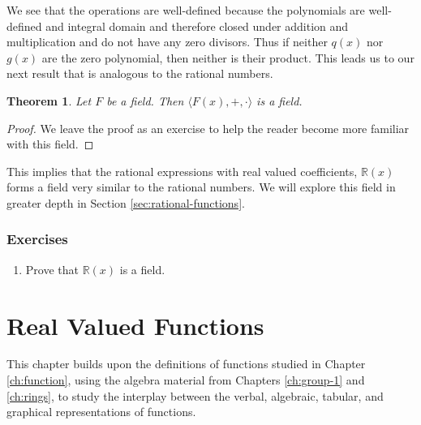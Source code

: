 \documentclass[
]{book}
\providecommand{\tightlist}{%
  \setlength{\itemsep}{0pt}\setlength{\parskip}{0pt}}
\newtheorem{theorem}{Theorem}[chapter]
\theoremstyle{definition}
\theoremstyle{definition}
\theoremstyle{definition}
\theoremstyle{remark}
\begin{document}
We see that the operations are well-defined because the polynomials are well-defined and integral domain and therefore closed under addition and multiplication and do not have any zero divisors. Thus if neither \(q(x)\) nor \(g(x)\) are the zero polynomial, then neither is their product. This leads us to our next result that is analogous to the rational numbers.

\begin{theorem}
\protect\hypertarget{thm:unnamed-chunk-207}{}{\label{thm:unnamed-chunk-207} }Let \(F\) be a field. Then \(\langle F(x),+,\cdot \rangle\) is a field.
\end{theorem}

\begin{proof}
{}We leave the proof as an exercise to help the reader become more familiar with this field.
\end{proof}

This implies that the rational expressions with real valued coefficients, \(\mathbb{R}(x)\) forms a field very similar to the rational numbers. We will explore this field in greater depth in Section \ref{sec:rational-functions}.

\hypertarget{exercises-26}{%
\subsection{Exercises}\label{exercises-26}}

\begin{enumerate}
\def\labelenumi{\arabic{enumi}.}
\tightlist
\item
  Prove that \(\mathbb{R}(x)\) is a field.
\end{enumerate}

\hypertarget{ch:real-valued-functions}{%
\chapter{Real Valued Functions}\label{ch:real-valued-functions}}

This chapter builds upon the definitions of functions studied in Chapter \ref{ch:function}, using the algebra material from Chapters \ref{ch:group-1} and \ref{ch:rings}, to study the interplay between the verbal, algebraic, tabular, and graphical representations of functions.
\end{document}
